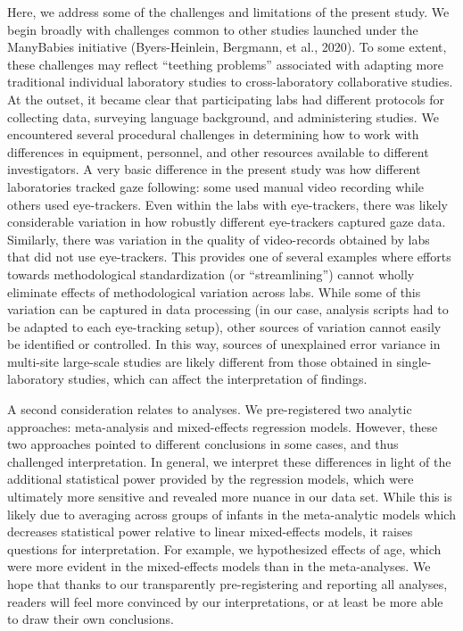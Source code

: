 \documentclass[,man,floatsintext]{apa6}
\begin{document}
Here, we address some of the challenges and limitations of the present study. We begin broadly with challenges common to other studies launched under the ManyBabies initiative (Byers-Heinlein, Bergmann, et al., 2020). To some extent, these challenges may reflect \enquote{teething problems} associated with adapting more traditional individual laboratory studies to cross-laboratory collaborative studies. At the outset, it became clear that participating labs had different protocols for collecting data, surveying language background, and administering studies. We encountered several procedural challenges in determining how to work with differences in equipment, personnel, and other resources available to different investigators. A very basic difference in the present study was how different laboratories tracked gaze following: some used manual video recording while others used eye-trackers. Even within the labs with eye-trackers, there was likely considerable variation in how robustly different eye-trackers captured gaze data. Similarly, there was variation in the quality of video-records obtained by labs that did not use eye-trackers. This provides one of several examples where efforts towards methodological standardization (or \enquote{streamlining}) cannot wholly eliminate effects of methodological variation across labs. While some of this variation can be captured in data processing (in our case, analysis scripts had to be adapted to each eye-tracking setup), other sources of variation cannot easily be identified or controlled. In this way, sources of unexplained error variance in multi-site large-scale studies are likely different from those obtained in single-laboratory studies, which can affect the interpretation of findings.

A second consideration relates to analyses. We pre-registered two analytic approaches: meta-analysis and mixed-effects regression models. However, these two approaches pointed to different conclusions in some cases, and thus challenged interpretation. In general, we interpret these differences in light of the additional statistical power provided by the regression models, which were ultimately more sensitive and revealed more nuance in our data set. While this is likely due to averaging across groups of infants in the meta-analytic models which decreases statistical power relative to linear mixed-effects models, it raises questions for interpretation. For example, we hypothesized effects of age, which were more evident in the mixed-effects models than in the meta-analyses. We hope that thanks to our transparently pre-registering and reporting all analyses, readers will feel more convinced by our interpretations, or at least be more able to draw their own conclusions.
\end{document}
